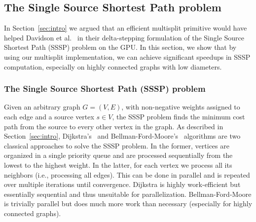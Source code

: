 \subsection{The Single Source Shortest Path problem}\label{sec:app_sssp}
In Section~\ref{sec:intro} we argued that an efficient multisplit primitive would have helped Davidson et al.~\cite{Davidson:2014:WPG:nourl} in their delta-stepping formulation of the Single Source Shortest Path (SSSP) problem on the GPU\@.
In this section, we show that by using our multisplit implementation, we can achieve significant speedups in SSSP computation, especially on highly connected graphs with low diameters.

\subsubsection{The Single Source Shortest Path (SSSP) problem}
Given an arbitrary graph $G = (V, E)$, with non-negative weights assigned to each edge and a source vertex $s\in V$, the SSSP problem finds the minimum cost path from the source to every other vertex in the graph.
As described in Section~\ref{sec:intro}, Dijkstra's~\cite{Dijkstra:1959:ANO} and Bellman-Ford-Moore's~\cite{Bang-Jensen:2009:DTA} algorithms are two classical approaches to solve the SSSP problem.
In the former, vertices are organized in a single priority queue and are processed sequentially from the lowest to the highest weight.
In the latter, for each vertex we process all its neighbors (i.e., processing all edges). This can be done in parallel and is repeated over multiple iterations until convergence.
Dijkstra is highly work-efficient but essentially sequential and thus unsuitable for parallelization.
Bellman-Ford-Moore is trivially parallel but does much more work than necessary (especially for highly connected graphs).

